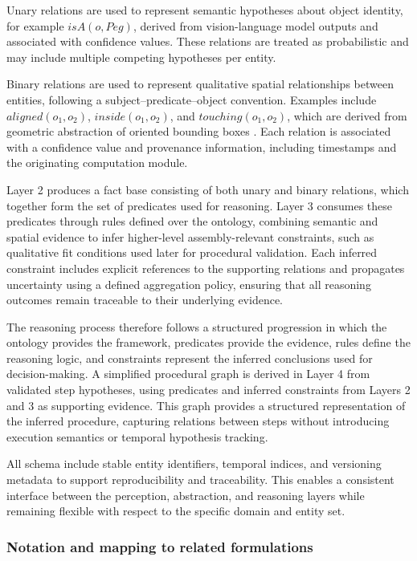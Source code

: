 \documentclass[11pt,titlepage,openright]{book}
\begin{document}
Unary relations are used to represent semantic hypotheses about object identity, for example $isA(o, Peg)$, derived from vision-language model outputs and associated with confidence values. These relations are treated as probabilistic and may include multiple competing hypotheses per entity.

Binary relations are used to represent qualitative spatial relationships between entities, following a subject--predicate--object convention. Examples include $aligned(o_1,o_2)$, $inside(o_1,o_2)$, and $touching(o_1,o_2)$, which are derived from geometric abstraction of oriented bounding boxes \citep{Haesler_2025}. Each relation is associated with a confidence value and provenance information, including timestamps and the originating computation module.

Layer 2 produces a fact base consisting of both unary and binary relations, which together form the set of predicates used for reasoning. Layer 3 consumes these predicates through rules defined over the ontology, combining semantic and spatial evidence to infer higher-level assembly-relevant constraints, such as qualitative fit conditions used later for procedural validation. Each inferred constraint includes explicit references to the supporting relations and propagates uncertainty using a defined aggregation policy, ensuring that all reasoning outcomes remain traceable to their underlying evidence.

The reasoning process therefore follows a structured progression in which the ontology provides the framework, predicates provide the evidence, rules define the reasoning logic, and constraints represent the inferred conclusions used for decision-making. A simplified procedural graph is derived in Layer 4 from validated step hypotheses, using predicates and inferred constraints from Layers 2 and 3 as supporting evidence. This graph provides a structured representation of the inferred procedure, capturing relations between steps without introducing execution semantics or temporal hypothesis tracking.

All schema include stable entity identifiers, temporal indices, and versioning metadata to support reproducibility and traceability. This enables a consistent interface between the perception, abstraction, and reasoning layers while remaining flexible with respect to the specific domain and entity set.


\subsubsection{Notation and mapping to related formulations}
\label{sec:notation-mapping}
\end{document}
